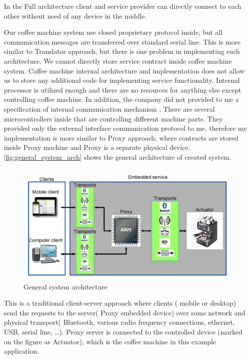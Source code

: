 In the Full architecture client and service provider can directly connect to
each other without need of any device in the middle. 

Our coffee machine system use closed proprietary protocol inside, but all
communication messages are transferred over standard serial line. This is more
similar to Translator approach, but there is one problem in implementing such
architecture. We cannot directly store service contract inside coffee machine
system. Coffee machine internal architecture and implementation does not allow
us to store any additional code for implementing service functionality. Internal
processor is utilized enough and there are no resources for anything else except
controlling coffee machine. In addition, the company did not
provided to me a specification of internal communication mechanism . There
are several microcontrollers inside that are controlling different machine
parts.
They provided  only the external interface communication protocol to me,
therefore my implementation is more similar to Proxy approach, where contracts are stored inside Proxy machine
and Proxy is a separate physical device.
\autoref{fig:general_system_arch} shows the general architecture of created
system.

\begin{center}
 \begin{figure}[h]
	\includegraphics[width=\textwidth]{../images/implementation/system_arch.png}
	\caption{General system architecture }
	\label{fig:general_system_arch}
 \end{figure}
\end{center}

This is a traditional client-server approach where clients ( mobile or desktop)
send the requests to the server( Proxy embedded device) over some network and
physical transport( Bluetooth, various radio frequency connections, ethernet,
USB, serial line, \ldots). Proxy server is connected to the controlled device 
(marked on the figure as Actuator), which is the coffee machine in this example
application.

